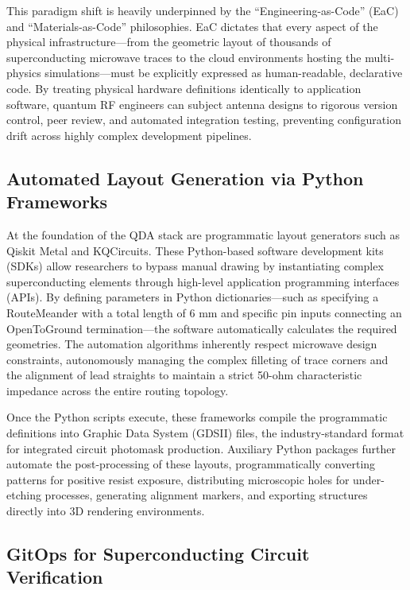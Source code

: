 \documentclass[11pt,a4paper]{article}
\begin{document}
This paradigm shift is heavily underpinned by the ``Engineering-as-Code'' (EaC) and ``Materials-as-Code'' philosophies.\cite{ref6} EaC dictates that every aspect of the physical infrastructure---from the geometric layout of thousands of superconducting microwave traces to the cloud environments hosting the multi-physics simulations---must be explicitly expressed as human-readable, declarative code.\cite{ref6} By treating physical hardware definitions identically to application software, quantum RF engineers can subject antenna designs to rigorous version control, peer review, and automated integration testing, preventing configuration drift across highly complex development pipelines.\cite{ref6}

\subsection{Automated Layout Generation via Python Frameworks}

At the foundation of the QDA stack are programmatic layout generators such as Qiskit Metal and KQCircuits.\cite{ref6} These Python-based software development kits (SDKs) allow researchers to bypass manual drawing by instantiating complex superconducting elements through high-level application programming interfaces (APIs).\cite{ref6} By defining parameters in Python dictionaries---such as specifying a RouteMeander with a total length of 6 mm and specific pin inputs connecting an OpenToGround termination---the software automatically calculates the required geometries.\cite{ref6} The automation algorithms inherently respect microwave design constraints, autonomously managing the complex filleting of trace corners and the alignment of lead straights to maintain a strict 50-ohm characteristic impedance across the entire routing topology.\cite{ref6}

Once the Python scripts execute, these frameworks compile the programmatic definitions into Graphic Data System (GDSII) files, the industry-standard format for integrated circuit photomask production.\cite{ref6} Auxiliary Python packages further automate the post-processing of these layouts, programmatically converting patterns for positive resist exposure, distributing microscopic holes for under-etching processes, generating alignment markers, and exporting structures directly into 3D rendering environments.\cite{ref6}

\subsection{GitOps for Superconducting Circuit Verification}
\end{document}
